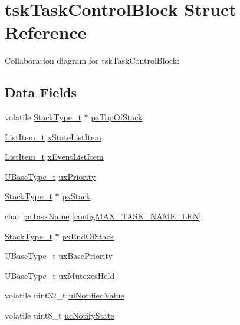 \hypertarget{structtsk_task_control_block}{}\section{tsk\+Task\+Control\+Block Struct Reference}
\label{structtsk_task_control_block}


Collaboration diagram for tsk\+Task\+Control\+Block\+:
\subsection*{Data Fields}
\begin{DoxyCompactItemize}
\item 
volatile \hyperlink{portmacro_8h_a84e9a8ba132feed0b2401c1f4e2ac63c}{Stack\+Type\+\_\+t} $\ast$ \hyperlink{structtsk_task_control_block_a41989bc39d576125f4492364592f9e1a}{px\+Top\+Of\+Stack}
\item 
\hyperlink{list_8h_a1a62d469392f9bfe2443e7efab9c8398}{List\+Item\+\_\+t} \hyperlink{structtsk_task_control_block_a2575f6a579ef61db0db66d7b1b52ec48}{x\+State\+List\+Item}
\item 
\hyperlink{list_8h_a1a62d469392f9bfe2443e7efab9c8398}{List\+Item\+\_\+t} \hyperlink{structtsk_task_control_block_a139605d93d834601f34be927ecba3a15}{x\+Event\+List\+Item}
\item 
\hyperlink{portmacro_8h_a646f89d4298e4f5afd522202b11cb2e6}{U\+Base\+Type\+\_\+t} \hyperlink{structtsk_task_control_block_a0befed3dd0fe55b4314158f4814f50ae}{ux\+Priority}
\item 
\hyperlink{portmacro_8h_a84e9a8ba132feed0b2401c1f4e2ac63c}{Stack\+Type\+\_\+t} $\ast$ \hyperlink{structtsk_task_control_block_aaecd48bdf732c1df94b258956ca85bd7}{px\+Stack}
\item 
char \hyperlink{structtsk_task_control_block_afa7d65deeca135b921eaa78fbbf52918}{pc\+Task\+Name} \mbox{[}\hyperlink{_free_r_t_o_s_config_8h_ac388dc4041aab6997348828eb27fc1a8}{config\+M\+A\+X\+\_\+\+T\+A\+S\+K\+\_\+\+N\+A\+M\+E\+\_\+\+L\+EN}\mbox{]}
\item 
\hyperlink{portmacro_8h_a84e9a8ba132feed0b2401c1f4e2ac63c}{Stack\+Type\+\_\+t} $\ast$ \hyperlink{structtsk_task_control_block_a4dce5803d159d724ff7fae2498834982}{px\+End\+Of\+Stack}
\item 
\hyperlink{portmacro_8h_a646f89d4298e4f5afd522202b11cb2e6}{U\+Base\+Type\+\_\+t} \hyperlink{structtsk_task_control_block_a2278f10f240db68c88ed8bed4db8d565}{ux\+Base\+Priority}
\item 
\hyperlink{portmacro_8h_a646f89d4298e4f5afd522202b11cb2e6}{U\+Base\+Type\+\_\+t} \hyperlink{structtsk_task_control_block_a2904448a3999fb238fd3e806dda91e2c}{ux\+Mutexes\+Held}
\item 
volatile uint32\+\_\+t \hyperlink{structtsk_task_control_block_a99c9bfaf922e092fb6ab2ee742677b46}{ul\+Notified\+Value}
\item 
volatile uint8\+\_\+t \hyperlink{structtsk_task_control_block_a9b6dd8e40ab81cf3febbd26ee9776cb2}{uc\+Notify\+State}
\end{DoxyCompactItemize}


